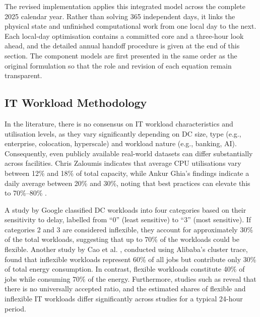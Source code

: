 The revised implementation applies this integrated model across the complete
2025 calendar year. Rather than solving 365 independent days, it links the
physical state and unfinished computational work from one local day to the next.
Each local-day optimisation contains a committed core and a three-hour look
ahead, and the detailed annual handoff procedure is given at the end of this
section. The component models are first presented in the same order as the
original formulation so that the role and revision of each equation remain
transparent.

\subsection{IT Workload Methodology}
 
In the literature, there is no consensus on IT workload characteristics and utilisation levels, as they vary significantly depending on DC size, type (e.g., enterprise, colocation, hyperscale) and workload nature (e.g., banking, AI). Consequently, even publicly available real-world datasets can differ substantially across facilities. Chris Zaloumis \cite{Zaloumis2022IBM} indicates that average CPU utilisations vary between 12\% and 18\% of total capacity, while Ankur Ghia's findings indicate a daily average between 20\% and 30\%, noting that best practices can elevate this to 70\%--80\% \cite{Ghia2011McKinsey}.
 
 A study by Google \cite{6779441} classified DC workloads into four categories based on their sensitivity to delay, labelled from ``0'' (least sensitive) to ``3'' (most sensitive). If categories 2 and 3 are considered inflexible, they account for approximately 30\% of the total workloads, suggesting that up to 70\% of the workloads could be flexible. Another study by Cao et al. \cite{Cao2022ApEn}, conducted using Alibaba's cluster trace, found that inflexible workloads represent 60\% of all jobs but contribute only 30\% of total energy consumption. In contrast, flexible workloads constitute 40\% of jobs while consuming 70\% of the energy. Furthermore, studies such as \cite{Misaghian2023TIA,Xu2023SPIE,Zhou2024IJEPES,Fu2020ApEn,Liu2012PER} reveal that there is no universally accepted ratio, and the estimated shares of flexible and inflexible IT workloads differ significantly across studies for a typical 24-hour period.

